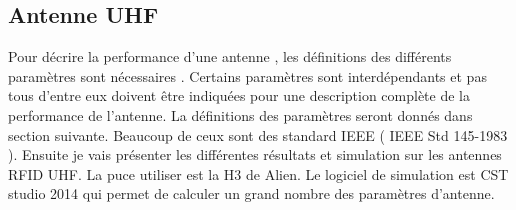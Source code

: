 \documentclass[11pt, a4paper, twoside]{book}
\begin{document}
\subsection{Antenne UHF}

Pour décrire la performance d'une antenne , les définitions des différents paramètres sont nécessaires . Certains paramètres sont interdépendants et pas tous d'entre eux doivent être indiquées pour une description complète de la performance de l'antenne. La définitions des paramètres seront donnés dans section suivante. Beaucoup de ceux sont des standard IEEE  ( IEEE Std 145-1983 ). Ensuite je vais présenter les différentes résultats et simulation sur les antennes RFID UHF. La puce utiliser est la H3 de Alien. Le logiciel de simulation est CST studio 2014 qui permet de calculer un grand nombre des paramètres d'antenne.\\
\end{document}
